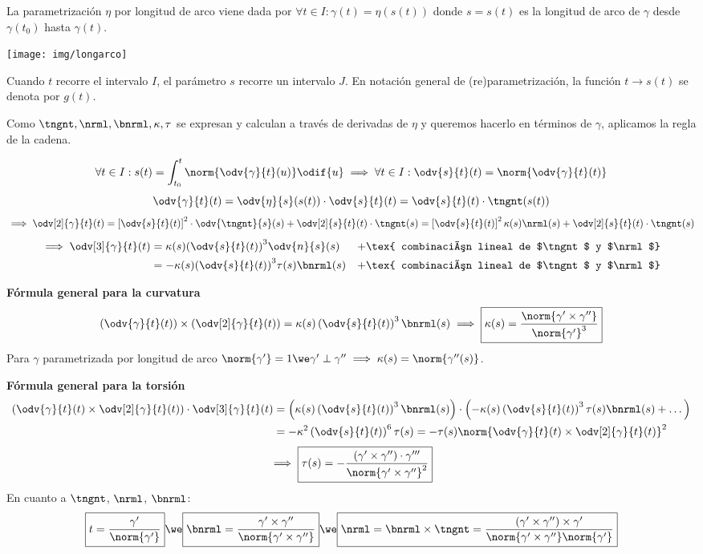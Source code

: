 La parametrización $\eta$ por longitud de arco viene dada por $\forall t \in I : \gamma(t) = \eta(s(t))$ donde $s=s(t)$ es la longitud de arco de $\gamma$ desde $\gamma(t_0)$ hasta $\gamma(t)$.
\begin{center}
	\texttt{[image: img/longarco]}
\end{center}
Cuando $t$ recorre el intervalo $I$, el parámetro $s$ recorre un intervalo $J$. En notación general de (re)parametrización, la función $t \to s(t)$ se denota por $g(t)$.

Como $\tngnt, \nrml, \bnrml, \kappa, \tau$ se expresan y calculan a través de derivadas de $\eta$ y queremos hacerlo en términos de $\gamma$, aplicamos la regla de la cadena.

\[\forall t \in I : s(t) = \int_{t_0}^t \norm{\odv{\gamma}{t}(u)}\odif{u} \implies \forall t \in I : \odv{s}{t}(t)=\norm{\odv{\gamma}{t}(t)}\]
\[\odv{\gamma}{t}(t)=\odv{\eta}{s}(s(t))\cdot\odv{s}{t}(t)=\odv{s}{t}(t)\cdot\tngnt(s(t))\]
\[\implies \odv[2]{\gamma}{t} (t) = \left[\odv{s}{t}(t)\right]^2\cdot\odv{\tngnt}{s}(s) + \odv[2]{s}{t}(t)\cdot\tngnt(s) = \left[\odv{s}{t}(t)\right]^2 \kappa(s) \nrml(s) + \odv[2]{s}{t}(t)\cdot\tngnt(s)\]
\[\begin{aligned}
		\implies \odv[3]{\gamma}{t}(t) & = \kappa(s){\left(\odv{s}{t}(t)\right)}^3\odv{n}{s}(s)      & + \tex{ combinación lineal de $\tngnt$ y $\nrml$} \\
		                               & = - \kappa(s){\left(\odv{s}{t}(t)\right)}^3\tau(s)\bnrml(s) & + \tex{ combinación lineal de $\tngnt$ y $\nrml$}
	\end{aligned}\]

\textbf{Fórmula general para la curvatura}
\[\left(\odv{\gamma}{t}(t)\right)\times\left(\odv[2]{\gamma}{t}(t)\right)=\kappa(s)\left(\odv{s}{t}(t)\right)^3\bnrml(s) \implies \boxed{\kappa(s)=\frac{\norm{\gamma'\times \gamma''}}{\norm{\gamma'}^3}}\]
Para $\gamma$ parametrizada por longitud de arco $\norm{\gamma'}=1 \we \gamma'\perp\gamma'' \implies \kappa(s)=\norm{\gamma''(s)}$.

\textbf{Fórmula general para la torsión}
\[\begin{aligned}
		\left(\odv{\gamma}{t}(t)\times\odv[2]{\gamma}{t}(t)\right) \cdot \odv[3]{\gamma}{t}(t) & = \left(\kappa(s)\left(\odv{s}{t}(t)\right)^3\bnrml(s)\right)\cdot\left(-\kappa(s)\left(\odv{s}{t}(t)\right)^3\tau(s)\bnrml(s) + \dots \right) \\
		                                                                                       & = - \kappa^2\left(\odv{s}{t}(t)\right)^6\tau(s)=-\tau(s)\norm{\odv{\gamma}{t}(t)\times\odv[2]{\gamma}{t}(t)}^2
	\end{aligned}\]
\[\implies \boxed{\tau(s)=-\frac{(\gamma'\times\gamma'')\cdot\gamma'''}{\norm{\gamma'\times\gamma''}^2}}\]
En cuanto a $\tngnt$, $\nrml$, $\bnrml$:
\[\boxed{t=\frac{\gamma'}{\norm{\gamma'}}} \we \boxed{\bnrml=\frac{\gamma'\times\gamma''}{\norm{\gamma'\times\gamma''}}} \we \boxed{\nrml=\bnrml\times\tngnt=\frac{\left(\gamma'\times\gamma''\right)\times\gamma'}{\norm{\gamma'\times\gamma''}\norm{\gamma'}}}\]

